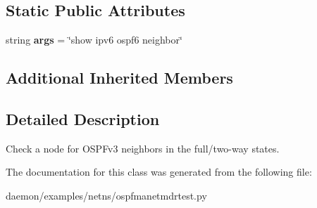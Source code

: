\subsection*{Static Public Attributes}
\begin{DoxyCompactItemize}
\item 
\hypertarget{classospfmanetmdrtest_1_1_ospf6_neigh_state_af363d9e120af6cdad5e7cb6b9a4c9a13}{string {\bfseries args} = \char`\"{}show ipv6 ospf6 neighbor\char`\"{}}\label{classospfmanetmdrtest_1_1_ospf6_neigh_state_af363d9e120af6cdad5e7cb6b9a4c9a13}

\end{DoxyCompactItemize}
\subsection*{Additional Inherited Members}


\subsection{Detailed Description}
\begin{DoxyVerb}Check a node for OSPFv3 neighbors in the full/two-way states. \end{DoxyVerb}
 

The documentation for this class was generated from the following file\+:\begin{DoxyCompactItemize}
\item 
daemon/examples/netns/ospfmanetmdrtest.\+py\end{DoxyCompactItemize}
